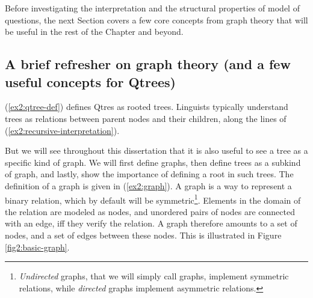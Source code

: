 Before investigating the interpretation and the structural properties of model of questions, the next Section covers a few core concepts from graph theory that will be useful in the rest of the Chapter and beyond.


\subsection{A brief refresher on graph theory (and a few useful concepts for Qtrees)}

(\ref{ex2:qtree-def}) defines Qtres as rooted trees. Linguists typically understand trees as relations between parent nodes and their children, along the lines of (\ref{ex2:recursive-interpretation}).

\begin{exe}
	\label{ex2:tree-inductive}
\end{exe}

But we will see throughout this dissertation that it is also useful to see a tree as a specific kind of graph. We will first define graphs, then define trees as a subkind of graph, and lastly, show the importance of defining a root in such trees. The definition of a graph is given in (\ref{ex2:graph}). A graph is a way to represent a binary relation, which by default will be symmetric\footnote{\textit{Undirected} graphs, that we will simply call graphs, implement symmetric relations, while \textit{directed} graphs implement asymmetric relations.}. Elements in the domain of the relation are modeled as nodes, and unordered pairs of nodes are connected with an edge, iff they verify the relation. A graph therefore amounts to a set of nodes, and a set of edges between these nodes. This is illustrated in Figure \ref{fig2:basic-graph}.

\begin{exe}	
	\label{ex2:graph}
\end{exe}

